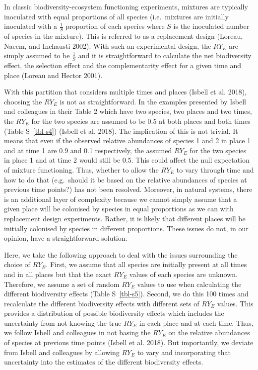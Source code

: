 \documentclass[
  letterpaper,
  DIV=11,
  numbers=noendperiod]{scrartcl}
\begin{document}
In classic biodiversity-ecosystem functioning experiments, mixtures are
typically inoculated with equal proportions of all species
(i.e.~mixtures are initially inoculated with a \(\frac{1}{S}\)
proportion of each species where \(S\) is the inoculated number of
species in the mixture). This is referred to as a replacement design
(Loreau, Naeem, and Inchausti 2002). With such an experimental design,
the \(RY_E\) are simply assumed to be \(\frac{1}{S}\) and it is
straightforward to calculate the net biodiversity effect, the selection
effect and the complementarity effect for a given time and place (Loreau
and Hector 2001).

With this partition that considers multiple times and places (Isbell et
al. 2018), choosing the \(RY_E\) is not as straightforward. In the
examples presented by Isbell and colleagues in their Table 2 which have
two species, two places and two times, the \(RY_E\) for the two species
are assumed to be 0.5 at both places and both times (Table
S~\ref{tbl-s4}) (Isbell et al. 2018). The implication of this is not
trivial. It means that even if the observed relative abundances of
species 1 and 2 in place 1 and at time 1 are 0.9 and 0.1 respectively,
the assumed \(RY_E\) for the two species in place 1 and at time 2 would
still be 0.5. This could affect the null expectation of mixture
functioning. Thus, whether to allow the \(RY_E\) to vary through time
and how to do that (e.g.~should it be based on the relative abundances
of species at previous time points?) has not been resolved. Moreover, in
natural systems, there is an additional layer of complexity because we
cannot simply assume that a given place will be colonised by species in
equal proportions as we can with replacement design experiments. Rather,
it is likely that different places will be initially colonised by
species in different proportions. These issues do not, in our opinion,
have a straightforward solution.

Here, we take the following approach to deal with the issues surrounding
the choice of \(RY_E\). First, we assume that all species are initially
present at all times and in all places but that the exact \(RY_E\)
values of each species are unknown. Therefore, we assume a set of random
\(RY_E\) values to use when calculating the different biodiversity
effects (Table S~\ref{tbl-s5}). Second, we do this 100 times and
recalculate the different biodiversity effects with different sets of
\(RY_E\) values. This provides a distribution of possible biodiversity
effects which includes the uncertainty from not knowing the true
\(RY_E\) in each place and at each time. Thus, we follow Isbell and
colleagues in not basing the \(RY_E\) on the relative abundances of
species at previous time points (Isbell et al. 2018). But importantly,
we deviate from Isbell and colleagues by allowing \(RY_E\) to vary and
incorporating that uncertainty into the estimates of the different
biodiversity effects.
\end{document}

